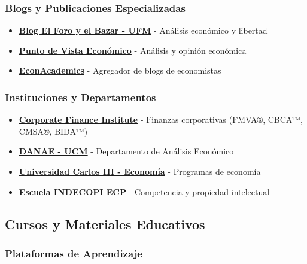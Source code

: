 \documentclass[
  jou,
  floatsintext,
  longtable,
  a4paper,
  nolmodern,
  notxfonts,
  notimes,
  12pt,
  colorlinks=true,linkcolor=blue,citecolor=blue,urlcolor=blue]{apa7}
\providecommand{\tightlist}{%
  \setlength{\itemsep}{0pt}\setlength{\parskip}{0pt}}
\begin{document}
\subsubsection{Blogs y Publicaciones
Especializadas}\label{blogs-y-publicaciones-especializadas}

\begin{itemize}
\tightlist
\item
  \textbf{\href{https://bazar.ufm.edu/}{Blog El Foro y el Bazar - UFM}}
  - Análisis económico y libertad
\item
  \textbf{\href{https://puntodevistaeconomico.com/}{Punto de Vista
  Económico}} - Análisis y opinión económica
\item
  \textbf{\href{https://www.econacademics.org/}{EconAcademics}} -
  Agregador de blogs de economistas
\end{itemize}

\subsubsection{Instituciones y
Departamentos}\label{instituciones-y-departamentos}

\begin{itemize}
\tightlist
\item
  \textbf{\href{https://corporatefinanceinstitute.com/}{Corporate
  Finance Institute}} - Finanzas corporativas (FMVA®, CBCA™, CMSA®,
  BIDA™)
\item
  \textbf{\href{https://www.ucm.es/fundamentos-analisis-economico2/grado}{DANAE
  - UCM}} - Departamento de Análisis Económico
\item
  \textbf{\href{https://economia.uc3m.es/grados/}{Universidad Carlos III
  - Economía}} - Programas de economía
\item
  \textbf{\href{https://www.escuela-indecopi.edu.pe/}{Escuela INDECOPI
  ECP}} - Competencia y propiedad intelectual
\end{itemize}

\subsection{Cursos y Materiales
Educativos}\label{cursos-y-materiales-educativos}

\subsubsection{Plataformas de
Aprendizaje}\label{plataformas-de-aprendizaje}
\end{document}

